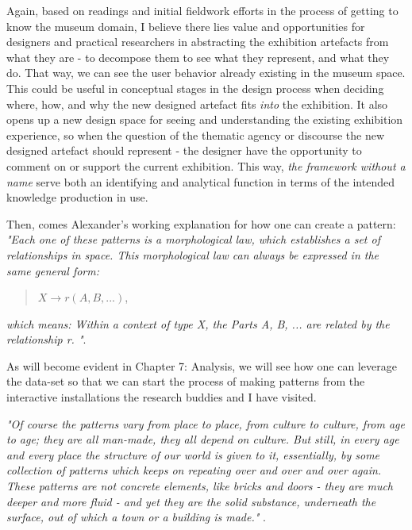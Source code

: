 Again, based on readings and initial fieldwork efforts in the process of getting to know the museum domain, I believe there lies value and opportunities for designers and practical researchers in abstracting the exhibition artefacts from what they are - to decompose them to see what they represent, and what they do. That way, we can see the user behavior already existing in the museum space. This could be useful in conceptual stages in the design process when deciding where, how, and why the new designed artefact fits \emph{into} the exhibition. It also opens up a new design space for seeing and understanding the existing exhibition experience, so when the question of the thematic agency or discourse the new designed artefact should represent - the designer have the opportunity to comment on or support the current exhibition. This way, \emph{the framework without a name} serve both an identifying and analytical function in terms of the intended knowledge production in use.

Then, comes Alexander's working explanation for how one can create a pattern: \emph{"Each one of these patterns is a morphological law, which establishes a set of relationships in space. This morphological law can always be expressed in the same general form:}

\begin{quote}
\centering $X \rightarrow r (A, B, ...)$,
\end{quote}

\emph{
which means: Within a context of type X, the Parts A, B, ... are related by the relationship r. "}\autocite[p. 90]{Alexander_book}.

As will become evident in Chapter 7: Analysis, we will see how one can leverage the data-set so that we can start the process of making patterns from the interactive installations the research buddies and I have visited.

\emph{"Of course the patterns vary from place to place, from culture to culture, from age to age; they are all man-made, they all depend on culture. But still, in every age and every place the structure of our world is given to it, essentially, by some collection of patterns which keeps on repeating over and over and over again. These patterns are not concrete elements, like bricks and doors - they are much deeper and more fluid - and yet they are the solid substance, underneath the surface, out of which a town or a building is made."} \autocite[p. 100]{Alexander_book}.


